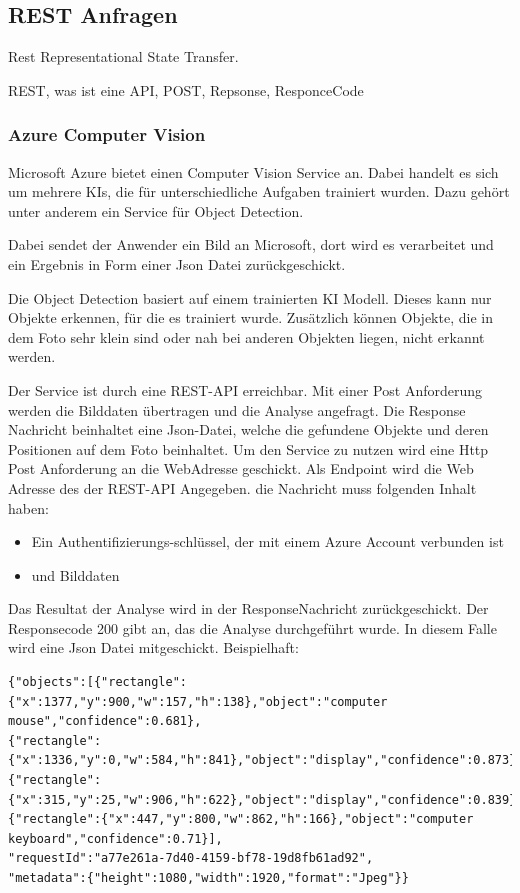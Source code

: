 \subsection{REST Anfragen}

Rest Representational State Transfer. 

REST, was ist eine API, POST, Repsonse, ResponceCode

\subsubsection{Azure Computer Vision}
Microsoft Azure bietet einen Computer Vision Service an. Dabei handelt es sich um mehrere KIs, die für unterschiedliche Aufgaben trainiert wurden. Dazu gehört unter anderem ein Service für Object Detection.

Dabei sendet der Anwender ein Bild an Microsoft, dort wird es verarbeitet und ein Ergebnis in Form einer Json Datei zurückgeschickt.\citep{getAzure,whatIsAzure,objDetectAzure,Azure302Doc}

Die Object Detection basiert auf einem trainierten KI Modell. Dieses kann nur Objekte erkennen, für die es trainiert wurde.
Zusätzlich können Objekte, die in dem Foto sehr klein sind oder nah bei anderen Objekten liegen, nicht erkannt werden.\citep{azureobjdetec}

Der Service ist durch eine REST-API erreichbar. Mit einer Post Anforderung werden die Bilddaten übertragen und die Analyse angefragt. Die Response Nachricht beinhaltet eine Json-Datei, welche die gefundene Objekte und deren Positionen auf dem Foto beinhaltet. 
Um den Service zu nutzen wird eine Http Post Anforderung an die WebAdresse geschickt. Als Endpoint wird die Web Adresse des der REST-API Angegeben. die Nachricht muss folgenden Inhalt haben:
\begin{itemize}
	\item Ein Authentifizierungs-schlüssel, der mit einem Azure Account verbunden ist
	\item und Bilddaten
\end{itemize}

Das Resultat der Analyse wird in der ResponseNachricht zurückgeschickt. Der Responsecode 200 gibt an, das die Analyse durchgeführt wurde. In diesem Falle wird eine Json Datei mitgeschickt. Beispielhaft:

\begin{lstlisting}
{"objects":[{"rectangle":{"x":1377,"y":900,"w":157,"h":138},"object":"computer mouse","confidence":0.681},
{"rectangle":{"x":1336,"y":0,"w":584,"h":841},"object":"display","confidence":0.873},
{"rectangle":{"x":315,"y":25,"w":906,"h":622},"object":"display","confidence":0.839},
{"rectangle":{"x":447,"y":800,"w":862,"h":166},"object":"computer keyboard","confidence":0.71}],
"requestId":"a77e261a-7d40-4159-bf78-19d8fb61ad92",
"metadata":{"height":1080,"width":1920,"format":"Jpeg"}}
\end{lstlisting}

